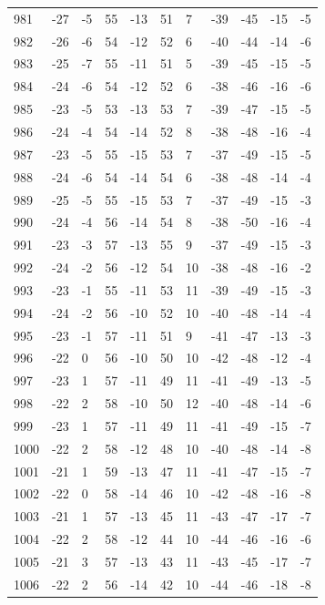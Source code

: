 \begin{table}[H]
\begin{tabular}{lllllllllll}
981 & -27 & -5 & 55 & -13 & 51 & 7 & -39 & -45 & -15 & -5 \\
982 & -26 & -6 & 54 & -12 & 52 & 6 & -40 & -44 & -14 & -6 \\
983 & -25 & -7 & 55 & -11 & 51 & 5 & -39 & -45 & -15 & -5 \\
984 & -24 & -6 & 54 & -12 & 52 & 6 & -38 & -46 & -16 & -6 \\
985 & -23 & -5 & 53 & -13 & 53 & 7 & -39 & -47 & -15 & -5 \\
986 & -24 & -4 & 54 & -14 & 52 & 8 & -38 & -48 & -16 & -4 \\
987 & -23 & -5 & 55 & -15 & 53 & 7 & -37 & -49 & -15 & -5 \\
988 & -24 & -6 & 54 & -14 & 54 & 6 & -38 & -48 & -14 & -4 \\
989 & -25 & -5 & 55 & -15 & 53 & 7 & -37 & -49 & -15 & -3 \\
990 & -24 & -4 & 56 & -14 & 54 & 8 & -38 & -50 & -16 & -4 \\
991 & -23 & -3 & 57 & -13 & 55 & 9 & -37 & -49 & -15 & -3 \\
992 & -24 & -2 & 56 & -12 & 54 & 10 & -38 & -48 & -16 & -2 \\
993 & -23 & -1 & 55 & -11 & 53 & 11 & -39 & -49 & -15 & -3 \\
994 & -24 & -2 & 56 & -10 & 52 & 10 & -40 & -48 & -14 & -4 \\
995 & -23 & -1 & 57 & -11 & 51 & 9 & -41 & -47 & -13 & -3 \\
996 & -22 & 0 & 56 & -10 & 50 & 10 & -42 & -48 & -12 & -4 \\
997 & -23 & 1 & 57 & -11 & 49 & 11 & -41 & -49 & -13 & -5 \\
998 & -22 & 2 & 58 & -10 & 50 & 12 & -40 & -48 & -14 & -6 \\
999 & -23 & 1 & 57 & -11 & 49 & 11 & -41 & -49 & -15 & -7 \\
1000 & -22 & 2 & 58 & -12 & 48 & 10 & -40 & -48 & -14 & -8 \\
1001 & -21 & 1 & 59 & -13 & 47 & 11 & -41 & -47 & -15 & -7 \\
1002 & -22 & 0 & 58 & -14 & 46 & 10 & -42 & -48 & -16 & -8 \\
1003 & -21 & 1 & 57 & -13 & 45 & 11 & -43 & -47 & -17 & -7 \\
1004 & -22 & 2 & 58 & -12 & 44 & 10 & -44 & -46 & -16 & -6 \\
1005 & -21 & 3 & 57 & -13 & 43 & 11 & -43 & -45 & -17 & -7 \\
1006 & -22 & 2 & 56 & -14 & 42 & 10 & -44 & -46 & -18 & -8 \\

\end{tabular}
\end{table}
